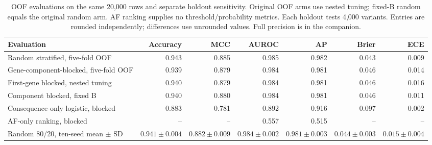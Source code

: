 \begin{table}[t]
\caption{OOF evaluations on the same 20,000 rows and separate holdout sensitivity. Original OOF arms use nested tuning; fixed-B random equals the original random arm. AF ranking supplies no threshold/probability metrics. Each holdout tests 4,000 variants. Entries are rounded independently; differences use unrounded values. Full precision is in the companion.}
\label{tab:primary}
\centering\footnotesize
\setlength{\tabcolsep}{3pt}
\begin{tabular}{@{}lrrrrrr@{}}
\toprule
Evaluation & Accuracy & MCC & AUROC & AP & Brier & ECE \\
\midrule
Random stratified, five-fold OOF & 0.943 & 0.885 & 0.985 & 0.982 & 0.043 & 0.009 \\
Gene-component-blocked, five-fold OOF & 0.939 & 0.879 & 0.984 & 0.981 & 0.046 & 0.014 \\
First-gene blocked, nested tuning & 0.940 & 0.879 & 0.984 & 0.981 & 0.046 & 0.016 \\
Component blocked, fixed B & 0.940 & 0.880 & 0.984 & 0.981 & 0.046 & 0.011 \\
Consequence-only logistic, blocked & 0.883 & 0.781 & 0.892 & 0.916 & 0.097 & 0.002 \\
AF-only ranking, blocked & -- & -- & 0.557 & 0.515 & -- & -- \\
\midrule
Random 80/20, ten-seed mean $\pm$ SD & $0.941\pm0.004$ & $0.882\pm0.009$ & $0.984\pm0.002$ & $0.981\pm0.003$ & $0.044\pm0.003$ & $0.015\pm0.004$ \\
\bottomrule
\end{tabular}
\end{table}
